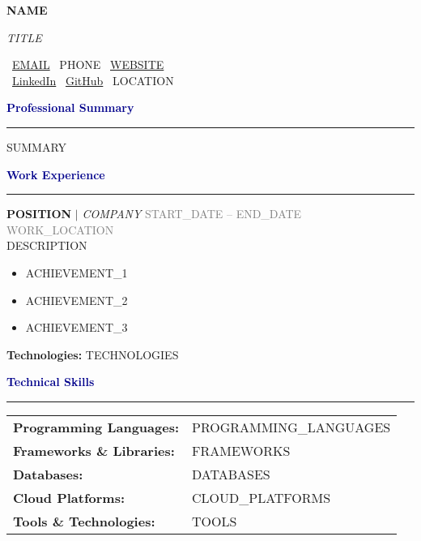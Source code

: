 \documentclass[11pt,letterpaper]{article}
\newcommand{\name}[1]{\centerline{\huge\textbf{#1}}}
\newcommand{\jobtitle}[1]{\centerline{\large\textit{#1}}}
\newcommand{\contact}[1]{\centerline{#1}}
\newcommand{\section}[1]{\textcolor{darkblue}{\textbf{\large #1}}\hrule\vspace{0.1in}}
\begin{document}
\name{{NAME}}
\jobtitle{{TITLE}}
\vspace{0.1in}
\contact{%
    \faEnvelope\ \href{mailto:{EMAIL}}{{EMAIL}} \quad
    \faPhone\ {PHONE} \quad
    \faGlobe\ \href{{WEBSITE}}{{WEBSITE}} \\
    \faLinkedin\ \href{{LINKEDIN}}{LinkedIn} \quad
    \faGithub\ \href{{GITHUB}}{GitHub} \quad
    \faMapMarker\ {LOCATION}
}
\vspace{0.2in}

\section{Professional Summary}
{SUMMARY}
\vspace{0.15in}

\section{Work Experience}

\textbf{{POSITION}} $|$ \textit{{COMPANY}} \hfill \textcolor{gray}{{START\_DATE} -- {END\_DATE}} \\
\textcolor{gray}{{WORK\_LOCATION}} \\
{DESCRIPTION}

\begin{itemize}[leftmargin=0.2in]
    \item {ACHIEVEMENT\_1}
    \item {ACHIEVEMENT\_2}
    \item {ACHIEVEMENT\_3}
\end{itemize}

\textbf{Technologies:} {TECHNOLOGIES}
\vspace{0.15in}

\section{Technical Skills}

\begin{tabular}{@{}ll@{}}
\textbf{Programming Languages:} & {PROGRAMMING\_LANGUAGES} \\
\textbf{Frameworks \& Libraries:} & {FRAMEWORKS} \\
\textbf{Databases:} & {DATABASES} \\
\textbf{Cloud Platforms:} & {CLOUD\_PLATFORMS} \\
\textbf{Tools \& Technologies:} & {TOOLS}
\end{tabular}
\vspace{0.15in}
\end{document}
